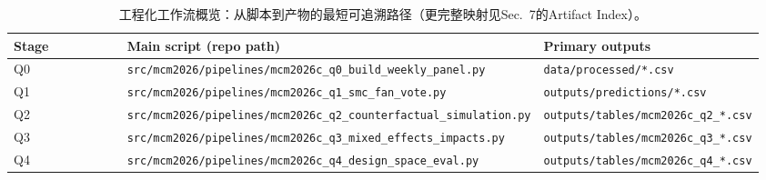 \begin{table}[H]
\centering
\small
\begin{tabularx}{\linewidth}{p{0.23\linewidth} p{0.52\linewidth} p{0.21\linewidth}}
\toprule
\textbf{Stage} & \textbf{Main script (repo path)} & \textbf{Primary outputs}\\
\midrule
Q0 & \texttt{src/mcm2026/pipelines/mcm2026c\_q0\_build\_weekly\_panel.py} & \texttt{data/processed/*.csv} \\
Q1 & \texttt{src/mcm2026/pipelines/mcm2026c\_q1\_smc\_fan\_vote.py} & \texttt{outputs/predictions/*.csv} \\
Q2 & \texttt{src/mcm2026/pipelines/mcm2026c\_q2\_counterfactual\_simulation.py} & \texttt{outputs/tables/mcm2026c\_q2\_*.csv} \\
Q3 & \texttt{src/mcm2026/pipelines/mcm2026c\_q3\_mixed\_effects\_impacts.py} & \texttt{outputs/tables/mcm2026c\_q3\_*.csv} \\
Q4 & \texttt{src/mcm2026/pipelines/mcm2026c\_q4\_design\_space\_eval.py} & \texttt{outputs/tables/mcm2026c\_q4\_*.csv} \\
\bottomrule
\end{tabularx}
\caption{工程化工作流概览：从脚本到产物的最短可追溯路径（更完整映射见Sec.~7的Artifact Index）。}
\end{table}
